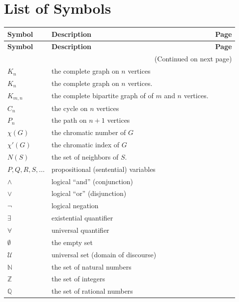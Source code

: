 \documentclass[10pt,]{book}
\theoremstyle{plain}
\theoremstyle{definition}
\theoremstyle{definition}
\theoremstyle{definition}
\numberwithin{equation}{chapter}
\def\N{\mathbb N}
\def\Z{\mathbb Z}
\def\Q{\mathbb Q}
\def\U{\mathcal U}
\begin{document}
\chapter[{List of Symbols}]{List of Symbols}\label{appendix-4}
\begin{longtable}[l]{lp{}r}
\textbf{Symbol}&\textbf{Description}&\textbf{Page}\\[1em]
\endfirsthead
\textbf{Symbol}&\textbf{Description}&\textbf{Page}\\[1em]
\endhead
\multicolumn{3}{r}{(Continued on next page)}\\
\endfoot
\endlastfoot
\(K_n\)&the complete graph on \(n\) vertices&\pageref{notation-1}\\
\(K_n\)&the complete graph on \(n\) vertices.&\pageref{notation-2}\\
\(K_{m,n}\)&the complete bipartite graph of of \(m\) and \(n\) vertices.&\pageref{notation-3}\\
\(C_n\)&the cycle on \(n\) vertices&\pageref{notation-4}\\
\(P_n\)&the path on \(n+1\) vertices&\pageref{notation-5}\\
\(\chi(G)\)&the chromatic number of \(G\)&\pageref{notation-6}\\
\(\chi'(G)\)&the chromatic index of \(G\)&\pageref{notation-7}\\
\(N(S)\)&the set of neighbors of \(S\).&\pageref{notation-8}\\
\(P, Q, R, S, \ldots\)&propositional (sentential) variables&\pageref{notation-9}\\
\(\wedge\)&logical ``and'' (conjunction)&\pageref{notation-10}\\
\(\vee\)&logical ``or'' (disjunction)&\pageref{notation-11}\\
\(\neg\)&logical negation&\pageref{notation-12}\\
\(\exists\)&existential quantifier&\pageref{notation-13}\\
\(\forall\)&universal quantifier&\pageref{notation-14}\\
\(\emptyset\)&the empty set&\pageref{notation-15}\\
\(\U\)&universal set (domain of discourse)&\pageref{notation-16}\\
\(\N\)&the set of natural numbers&\pageref{notation-17}\\
\(\Z\)&the set of integers&\pageref{notation-18}\\
\(\Q\)&the set of rational numbers&\pageref{notation-19}\\

\end{longtable}
\end{document}
